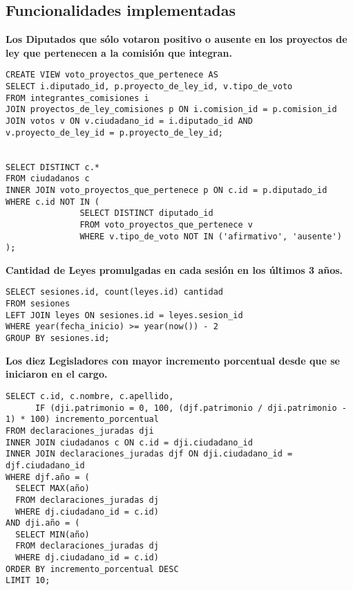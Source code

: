 \subsection{Funcionalidades implementadas}

\textbf{Los Diputados que sólo votaron positivo o ausente en los proyectos de ley que pertenecen a la comisión que integran.}

\begin{verbatim}
CREATE VIEW voto_proyectos_que_pertenece AS
SELECT i.diputado_id, p.proyecto_de_ley_id, v.tipo_de_voto
FROM integrantes_comisiones i
JOIN proyectos_de_ley_comisiones p ON i.comision_id = p.comision_id
JOIN votos v ON v.ciudadano_id = i.diputado_id AND v.proyecto_de_ley_id = p.proyecto_de_ley_id;


SELECT DISTINCT c.*
FROM ciudadanos c
INNER JOIN voto_proyectos_que_pertenece p ON c.id = p.diputado_id
WHERE c.id NOT IN (
               SELECT DISTINCT diputado_id
               FROM voto_proyectos_que_pertenece v
               WHERE v.tipo_de_voto NOT IN ('afirmativo', 'ausente')
);

\end{verbatim}

\textbf{Cantidad de Leyes promulgadas en cada sesión en los últimos 3 años.}

\begin{verbatim}
SELECT sesiones.id, count(leyes.id) cantidad
FROM sesiones 
LEFT JOIN leyes ON sesiones.id = leyes.sesion_id
WHERE year(fecha_inicio) >= year(now()) - 2
GROUP BY sesiones.id;

\end{verbatim}

\newpage
\textbf{Los diez Legisladores con mayor incremento porcentual desde que se
iniciaron en el cargo.}

\begin{verbatim}
SELECT c.id, c.nombre, c.apellido,
      IF (dji.patrimonio = 0, 100, (djf.patrimonio / dji.patrimonio - 1) * 100) incremento_porcentual
FROM declaraciones_juradas dji
INNER JOIN ciudadanos c ON c.id = dji.ciudadano_id
INNER JOIN declaraciones_juradas djf ON dji.ciudadano_id = djf.ciudadano_id
WHERE djf.año = (
  SELECT MAX(año)
  FROM declaraciones_juradas dj
  WHERE dj.ciudadano_id = c.id)
AND dji.año = (
  SELECT MIN(año)
  FROM declaraciones_juradas dj
  WHERE dj.ciudadano_id = c.id)
ORDER BY incremento_porcentual DESC
LIMIT 10;

\end{verbatim}

